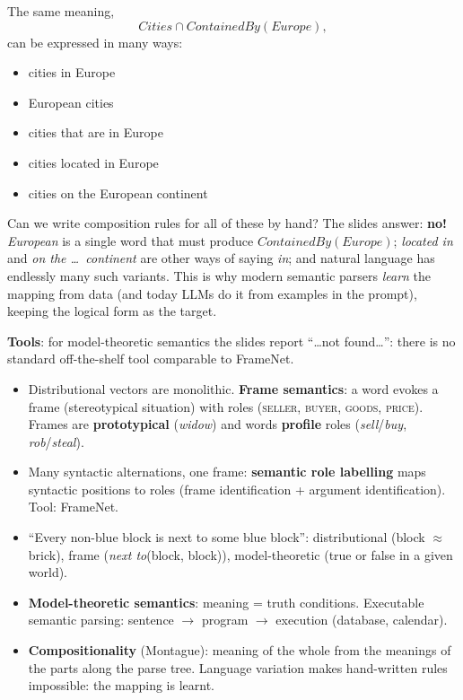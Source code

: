 The same meaning,
\[ \textit{Cities} \cap \textit{ContainedBy}(\textit{Europe}), \]
can be expressed in many ways:
\begin{itemize}[nosep]
  \item cities in Europe
  \item European cities
  \item cities that are in Europe
  \item cities located in Europe
  \item cities on the European continent
\end{itemize}
Can we write composition rules for all of these by hand? The slides answer:
\textbf{no!} \emph{European} is a single word that must produce
$\textit{ContainedBy}(\textit{Europe})$; \emph{located in} and \emph{on the \ldots\
continent} are other ways of saying \emph{in}; and natural language has endlessly many
such variants. This is why modern semantic parsers \emph{learn} the mapping from data
(and today LLMs do it from examples in the prompt), keeping the logical form as the
target.

\textbf{Tools}: for model-theoretic semantics the slides report ``\ldots not found\ldots'':
there is no standard off-the-shelf tool comparable to FrameNet.

\begin{nbsummary}
\begin{itemize}[nosep]
  \item Distributional vectors are monolithic. \textbf{Frame semantics}: a word evokes a
        frame (stereotypical situation) with roles (\textsc{seller}, \textsc{buyer},
        \textsc{goods}, \textsc{price}). Frames are \textbf{prototypical} (\emph{widow})
        and words \textbf{profile} roles (\emph{sell}/\emph{buy}, \emph{rob}/\emph{steal}).
  \item Many syntactic alternations, one frame: \textbf{semantic role labelling} maps
        syntactic positions to roles (frame identification + argument identification).
        Tool: FrameNet.
  \item ``Every non-blue block is next to some blue block'': distributional (block
        $\approx$ brick), frame (\emph{next to}(block, block)), model-theoretic (true or
        false in a given world).
  \item \textbf{Model-theoretic semantics}: meaning = truth conditions. Executable
        semantic parsing: sentence $\to$ program $\to$ execution (database, calendar).
  \item \textbf{Compositionality} (Montague): meaning of the whole from the meanings of
        the parts along the parse tree. Language variation makes hand-written rules
        impossible: the mapping is learnt.
\end{itemize}
\end{nbsummary}
